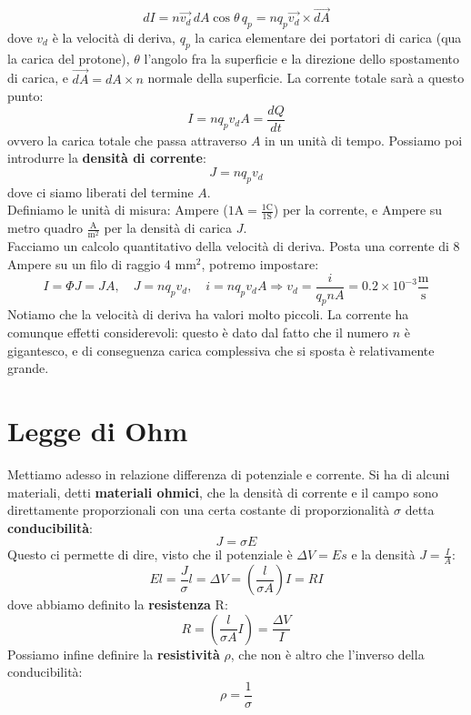 \documentclass[a4paper,12pt]{article}
\begin{document}
$$ dI = n\vec{v_d}\,dA\cos{\theta}\,q_p = nq_p\vec{v_d} \times \vec{dA} $$
dove $v_d$ è la velocità di deriva, $q_p$ la carica elementare dei portatori di carica (qua la carica del protone), $\theta$ l'angolo fra la superficie e la direzione dello spostamento di carica, e $\vec{dA} = dA \times n$ normale
della superficie. La corrente totale sarà a questo punto:
$$ I = nq_pv_dA = \frac{dQ}{dt} $$
ovvero la carica totale che passa attraverso $A$ in un unità di tempo. Possiamo poi introdurre la \textbf{densità di corrente}:
$$ J = nq_pv_d $$
dove ci siamo liberati del termine $A$. \\
Definiamo le unità di misura: Ampere ($1\mathrm{A} = \frac{1\mathrm{C}}{1\mathrm{S}}$) per la corrente, e  Ampere su metro quadro $\frac{\mathrm{A}}{\mathrm{m^2}}$ per la densità di carica $J$. \\
Facciamo un calcolo quantitativo della velocità di deriva. Posta una corrente di 8 Ampere su un filo di raggio 4 $\mathrm{mm}^2$, potremo impostare:
$$ I = \Phi{J} = JA, \quad J = nq_pv_d, \quad i = nq_pv_dA \Rightarrow v_d = \frac{i}{q_p n A} = 0.2 \times 10^{-3} \frac{\mathrm{m}}{\mathrm{s}} $$
Notiamo che la velocità di deriva ha valori molto piccoli. La corrente ha comunque effetti considerevoli: questo è dato dal fatto che il numero $n$ è gigantesco, e di conseguenza carica complessiva che si sposta è relativamente grande.
\section{Legge di Ohm}
Mettiamo adesso in relazione differenza di potenziale e corrente. Si ha di alcuni materiali, detti \textbf{materiali ohmici}, che la densità di corrente e il campo sono direttamente proporzionali con una certa costante di proporzionalità
$\sigma$ detta \textbf{conducibilità}:
$$ J = \sigma E $$
Questo ci permette di dire, visto che il potenziale è $\Delta V = Es$ e la densità $J = \frac{I}{A}$:
$$ El = \frac{J}{\sigma}l = \Delta V = \left(\frac{l}{\sigma A}\right)I = RI $$
dove abbiamo definito la \textbf{resistenza} R:
$$ R = \left(\frac{l}{\sigma A}I \right) = \frac{\Delta V}{I} $$
Possiamo infine definire la \textbf{resistività} $\rho$, che non è altro che l'inverso della conducibilità:
$$ \rho = \frac{1}{\sigma} $$
\end{document}
